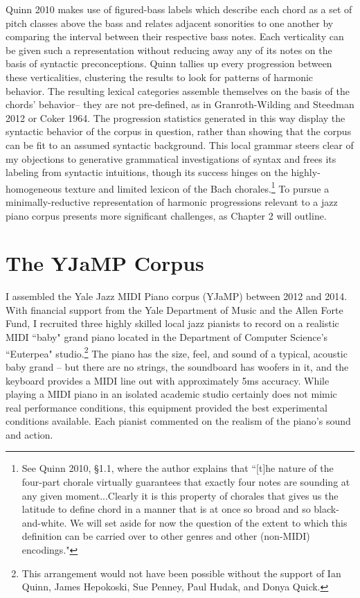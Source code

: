 Quinn 2010 makes use of figured-bass labels which describe each chord as a set of pitch classes above the bass and relates adjacent sonorities to one another by comparing the interval between their respective bass notes.  Each verticality can be given such a representation without reducing away any of its notes on the basis of syntactic preconceptions.  Quinn tallies up every progression between these verticalities, clustering the results to look for patterns of harmonic behavior.  The resulting lexical categories assemble themselves on the basis of the chords' behavior-- they are not pre-defined, as in Granroth-Wilding and Steedman 2012 or Coker 1964.  The progression statistics generated in this way display the syntactic behavior of the corpus in question, rather than showing that the corpus can be fit to an assumed syntactic background.  This local grammar steers clear of my objections to generative grammatical investigations of syntax and frees its labeling from syntactic intuitions, though its success hinges on the highly-homogeneous texture and limited lexicon of the Bach chorales.\footnote{See Quinn 2010, \S 1.1, where the author explains that ``[t]he nature of the four-part chorale virtually guarantees that exactly four notes are sounding at any given moment...Clearly it is this property of chorales that gives us the latitude to define chord in a manner that is at once so broad and so black-and-white. We will set aside for now the question of the extent to which this definition can be carried over to other genres and other (non-MIDI) encodings."}  To pursue a minimally-reductive representation of harmonic progressions relevant to a jazz piano corpus presents more significant challenges, as Chapter 2 will outline.

\section{The YJaMP Corpus}

I assembled the Yale Jazz MIDI Piano corpus (YJaMP) between 2012 and 2014.  With financial support from the Yale Department of Music and the Allen Forte Fund, I recruited three highly skilled local jazz pianists to record on a realistic MIDI ``baby" grand piano located in the Department of Computer Science's ``Euterpea" studio.\footnote{This arrangement would not have been possible without the support of Ian Quinn, James Hepokoski, Sue Penney, Paul Hudak, and Donya Quick.}  The piano has the size, feel, and sound of a typical, acoustic baby grand -- but there are no strings, the soundboard has woofers in it, and the keyboard provides a MIDI line out with approximately 5ms accuracy.  While playing a MIDI piano in an isolated academic studio certainly does not mimic real performance conditions, this equipment provided the best experimental conditions available.  Each pianist commented on the realism of the piano's sound and action.

